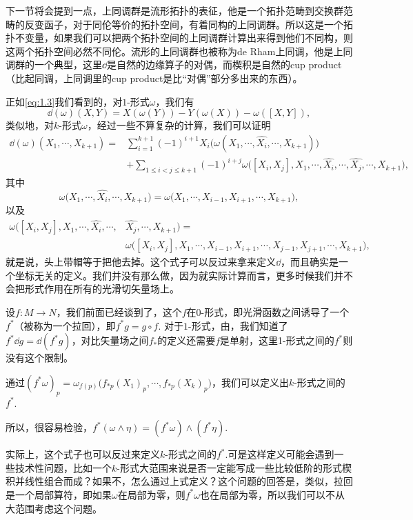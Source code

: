 下一节将会提到一点，上同调群是流形拓扑的表征，他是一个拓扑范畴到交换群范畴的反变函子，对于同伦等价的拓扑空间，有着同构的上同调群。所以这是一个拓扑不变量，如果我们可以把两个拓扑空间的上同调群计算出来得到他们不同构，则这两个拓扑空间必然不同伦。流形的上同调群也被称为de Rham上同调，他是上同调群的一个典型，这里$\dd$是自然的边缘算子的对偶，而楔积是自然的cup product（比起同调，上同调里的cup product是比“对偶”部分多出来的东西）。

\para 正如\eqref{eq:1.3}我们看到的，对$1$-形式$\omega$，我们有
\[
	\dd(\omega)(X,Y)=X(\omega(Y))-Y(\omega(X))-\omega([X,Y]),
\]
类似地，对$k$-形式$\omega$，经过一些不算复杂的计算，我们可以证明
\[
\begin{split}
	\dd(\omega)(X_1,\cdots,X_{k+1})=&\sum_{i=1}^{k+1}(-1)^{i+1}X_i\bigl(\omega(X_1,\cdots,\hat{X_i},\cdots,X_{k+1})\bigr)\\
	&+\sum_{1\leq i<j\leq k+1}(-1)^{i+j}\omega\bigl([X_i,X_j],X_1,\cdots,\hat{X_i},\cdots,\hat{X_j},\cdots,X_{k+1}\bigr),
\end{split}
\]
其中
\[
	\omega\bigl(X_1,\cdots,\hat{X_i},\cdots,X_{k+1}\bigr)=\omega\bigl(X_1,\cdots,X_{i-1},X_{i+1},\cdots,X_{k+1}\bigr),
\]
以及
\[
\begin{split}
	\omega\bigl([X_i,X_j],X_1,\cdots,\hat{X_i},\cdots,&\hat{X_j},\cdots,X_{k+1}\bigr)=\\
	&\omega\bigl([X_i,X_j],X_1,\cdots,X_{i-1},X_{i+1},\cdots,X_{j-1},X_{j+1},\cdots,X_{k+1}\bigr),
\end{split}
\]
就是说，头上带帽等于把他去掉。这个式子可以反过来拿来定义$\dd$，而且确实是一个坐标无关的定义。我们并没有那么做，因为就实际计算而言，更多时候我们并不会把形式作用在所有的光滑切矢量场上。

\para 设$f:M\to N$，我们前面已经谈到了，这个$f$在0-形式，即光滑函数之间诱导了一个$f^*$（被称为一个拉回），即$f^*g=g\circ f$. 对于$1$-形式，由，我们知道了$f^*\dd g=\dd (f^* g)$，对比矢量场之间$f_*$的定义还需要$f$是单射，这里1-形式之间的$f^*$则没有这个限制。

\para 通过$(f^*\omega)_p=\omega_{f(p)}\bigl(f_{*p}(X_1)_p,\cdots,f_{*p}(X_k)_p\bigr)$，我们可以定义出$k$-形式之间的$f^*$.

\para 所以，很容易检验，$f^*(\omega\wedge \eta)=(f^*\omega)\wedge (f^*\eta)$.

实际上，这个式子也可以反过来定义$k$-形式之间的$f^*$.可是这样定义可能会遇到一些技术性问题，比如一个$k$-形式大范围来说是否一定能写成一些比较低阶的形式楔积并线性组合而成？如果不，怎么通过上式定义？这个问题的回答是，类似，拉回是一个局部算符，即如果$\omega$在局部为零，则$f^*\omega$也在局部为零，所以我们可以不从大范围考虑这个问题。

